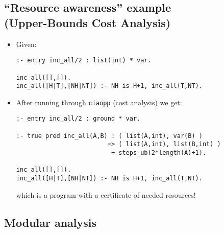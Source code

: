 \documentclass{article}
\renewcommand{\_}{\char'137}
\begin{document}
\subsection{``Resource awareness'' example \\ (Upper-Bounds Cost Analysis)}

\begin{itemize}
\item Given:
\begin{verbatim}
:- entry inc_all/2 : list(int) * var.

inc_all([],[]).
inc_all([H|T],[NH|NT]) :- NH is H+1, inc_all(T,NT).
\end{verbatim}

\item After running through \texttt{ciaopp} (cost analysis) we get:
\begin{verbatim}
:- entry inc_all/2 : ground * var.

:- true pred inc_all(A,B) : ( list(A,int), var(B) )
                         => ( list(A,int), list(B,int) )
                          + steps_ub(2*length(A)+1).

inc_all([],[]).
inc_all([H|T],[NH|NT]) :- NH is H+1, inc_all(T,NT).
\end{verbatim}
which is a program with a certificate of needed resources!
\end{itemize}

\subsection{Modular analysis}
\end{document}
